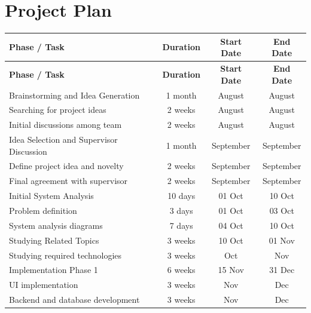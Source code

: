 \section{Project Plan}
\renewcommand{\arraystretch}{1.4}

\begin{longtable}{|>{\raggedright\arraybackslash}p{6cm}|c|c|c|}
\hline
\textbf{Phase / Task} &
\textbf{Duration} &
\textbf{Start Date} &
\textbf{End Date} \\
\hline
\endfirsthead

\hline
\textbf{Phase / Task} &
\textbf{Duration} &
\textbf{Start Date} &
\textbf{End Date} \\
\hline
\endhead

\hline
\endfoot

\hline
\endlastfoot

\rowcolor{gray!20}
Brainstorming and Idea Generation & 1 month & August & August \\
\hline
Searching for project ideas & 2 weeks & August & August \\
\hline
Initial discussions among team & 2 weeks & August & August \\
\hline

\rowcolor{gray!20}
Idea Selection and Supervisor Discussion & 1 month & September & September \\
\hline
Define project idea and novelty & 2 weeks & September & September \\
\hline
Final agreement with supervisor & 2 weeks & September & September \\
\hline

\rowcolor{gray!20}
Initial System Analysis & 10 days & 01 Oct & 10 Oct \\
\hline
Problem definition & 3 days & 01 Oct & 03 Oct \\
\hline
System analysis diagrams & 7 days & 04 Oct & 10 Oct \\
\hline

\rowcolor{gray!20}
Studying Related Topics & 3 weeks & 10 Oct & 01 Nov \\
\hline
Studying required technologies & 3 weeks & Oct & Nov \\
\hline

\rowcolor{gray!20}
Implementation Phase 1 & 6 weeks & 15 Nov & 31 Dec \\
\hline
UI implementation & 3 weeks & Nov & Dec \\
\hline
Backend and database development & 3 weeks & Nov & Dec \\
\hline


\end{longtable}
